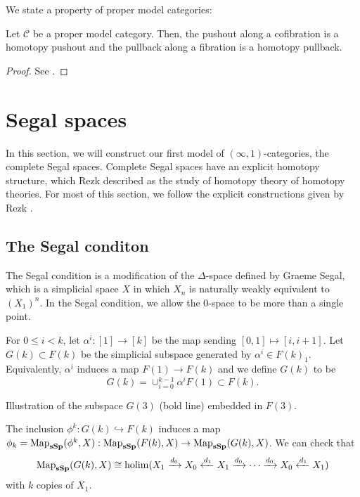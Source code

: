 \begin{refsection}
We state a property of proper model categories:

\begin{prop}\label{hompullback}
Let $\mathcal{C}$ be a proper model category. Then, the pushout along a cofibration is a homotopy pushout and the pullback along a fibration is a homotopy pullback.
\end{prop}
\begin{proof}
See \cite[Prop A.2.2.4]{htt}.
\end{proof}

\section{Segal spaces}
In this section, we will construct our first model of $(\infty,1)$-categories, the complete Segal spaces. Complete Segal spaces have an explicit homotopy structure, which Rezk described as the study of homotopy theory of homotopy theories. For most of this section, we follow the explicit constructions given by Rezk \cite{rezk}.

\subsection{The Segal conditon}
The Segal condition is a modification of the $\Delta$-space defined by Graeme Segal, which is a simplicial space $X$ in which $X_n$ is naturally weakly equivalent to $(X_1)^n$. In the Segal condition, we allow the $0$-space to be more than a single point.

For $0\le i<k$, let $\alpha^i:[1]\to [k]$ be the map sending $[0,1]\mapsto [i,i+1]$. Let $G(k)\subset F(k)$ be the simplicial subspace generated by $\alpha^i\in F(k)_1$. Equivalently, $\alpha^i$ induces a map $F(1)\to F(k)$ and we define $G(k)$ to be
$$G(k)=\cup_{i=0}^{k-1}\alpha^iF(1)\subset F(k).$$
\begin{center}

Illustration of the subspace $G(3)$ (bold line) embedded in $F(3)$.
\end{center}
The inclusion $\phi^k:G(k)\hookrightarrow F(k)$ induces a map $\phi_k=\operatorname{\mathrm{Map}}_{\mathbf{sSp}}(\phi^k,X):\operatorname{\mathrm{Map}}_{\mathbf{sSp}}(F(k),X)\to\operatorname{\mathrm{Map}}_{\mathbf{sSp}}(G(k),X)$. We can check that
\begin{equation}\label{eq seg con}
\operatorname{\mathrm{Map}}_{\mathbf{sSp}}(G(k),X)\cong\operatorname*{holim}(X_1\xrightarrow{d_0}X_0\xleftarrow{d_1}X_1\xrightarrow{d_0}\cdots\xrightarrow{d_0}X_0\xleftarrow{d_1}X_1)
\end{equation}
with $k$ copies of $X_1$.


\end{refsection}
